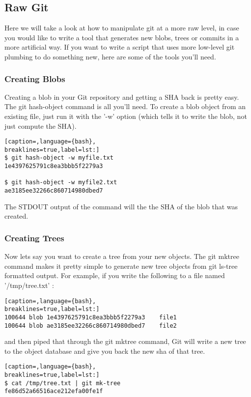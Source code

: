 \subsection{Raw Git}
Here we will take a look at how to manipulate git at a more raw level, in case
you would like to write a tool that generates new blobs, trees or commits in a
more artificial way. If you want to write a script that uses more low-level git
plumbing to do something new, here are some of the tools you'll need.

\subsubsection{Creating Blobs}
Creating a blob in your Git repository and getting a SHA back is pretty easy.
The git hash-object command is all you'll need. To create a blob object from an
existing file, just run it with the '-w' option (which tells it to write the
blob, not just compute the SHA).
\lstset{basicstyle=\scriptsize, numbers=none, captionpos=b, tabsize=4}
\begin{lstlisting}[caption=,language={bash},
breaklines=true,label=lst:]
$ git hash-object -w myfile.txt
1e4397625791c8ea3bbb5f2279a3

$ git hash-object -w myfile2.txt
ae3185ee32266c860714980dbed7
\end{lstlisting}

The STDOUT output of the command will the the SHA of the blob that was created.

\subsubsection{Creating Trees}
Now lets say you want to create a tree from your new objects. The git mktree
command makes it pretty simple to generate new tree objects from git ls-tree
formatted output. For example, if you write the following to a file named
'/tmp/tree.txt' :
\lstset{basicstyle=\scriptsize, numbers=none, captionpos=b, tabsize=4}
\begin{lstlisting}[caption=,language={bash},
breaklines=true,label=lst:]
100644 blob 1e4397625791c8ea3bbb5f2279a3    file1
100644 blob ae3185ee32266c860714980dbed7    file2
\end{lstlisting}

and then piped that through the git mktree command, Git will write a new tree
to the object database and give you back the new sha of that tree.
\lstset{basicstyle=\scriptsize, numbers=none, captionpos=b, tabsize=4}
\begin{lstlisting}[caption=,language={bash},
breaklines=true,label=lst:]
$ cat /tmp/tree.txt | git mk-tree
fe86d52a66516ace212efa00fe1f
\end{lstlisting}

